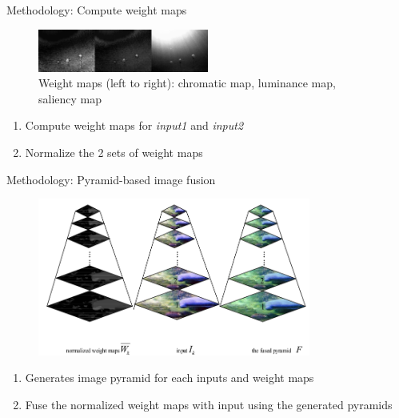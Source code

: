 \documentclass[13pt]{beamer}
\begin{document}
\begin{frame}{Methodology: Compute weight maps}

  \begin{figure}[ht]
      \centering
      \includegraphics[width=0.5\textwidth, height=0.2\textwidth]{figs/weightmaps.png}
      \caption{Weight maps (left to right): chromatic map, luminance map,
        saliency map}
  \end{figure}

  \begin{enumerate}
    \item Compute weight maps for \textit{input1} and \textit{input2}
    \item Normalize the 2 sets of weight maps
  \end{enumerate}
\end{frame}

\begin{frame}{Methodology: Pyramid-based image fusion}

  \begin{figure}[ht]
      \centering
      \includegraphics[width=0.8\textwidth, height=0.4\textwidth]{figs/pyramid.png}
  \end{figure}

  \begin{enumerate}
    \item Generates image pyramid for each inputs and weight maps
    \item Fuse the normalized weight maps with input  using the generated pyramids
  \end{enumerate}
\end{frame}
\end{document}
